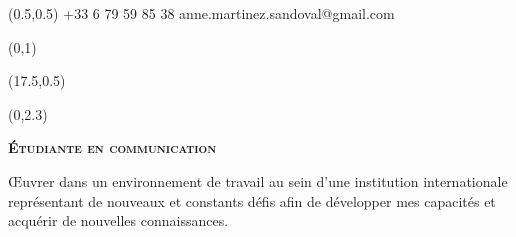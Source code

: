 \documentclass[30pt, french]{tccv}
\begin{document}
\begin{upshape}
\fontsize{9pt}{1em}\color{text}\selectfont



%
%




\begin{textblock}{6.5}(0.5,0.5)
    {+33 6 79 59 85 38}
    {anne.martinez.sandoval@gmail.com}
\end{textblock}

\begin{textblock}{21}(0,1)
\end{textblock}

\begin{textblock}{21}(17.5,0.5)
\end{textblock}  



\begin{textblock}{21}(0,2.3)

\begin{center}
\fontsize{10pt}{1.5em}\color{text}\bodyfontlight\upshape\selectfont

	{\fontsize{14pt}{5em}\scshape\bfseries \'Etudiante en communication\\} 

	\vspace{5pt}
Œuvrer dans un environnement de travail au sein d’une institution internationale représentant de nouveaux et constants défis afin de développer mes capacités et acquérir de nouvelles connaissances. 
\end{center}
\end{textblock}  





%
%


\end{upshape}
\end{document}
